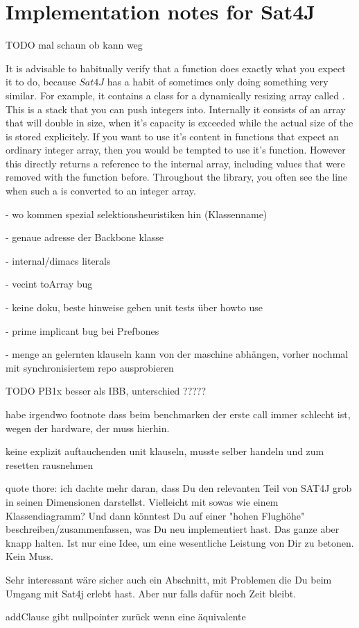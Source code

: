 \section{Implementation notes for Sat4J}




TODO mal schaun ob kann weg


It is advisable to habitually verify that a function does exactly what you expect it to do, because $Sat4J$ has a habit of sometimes only doing something very similar. For example, it contains a class for a dynamically resizing array called . This is a stack that you can push integers into. Internally it consists of an array that will double in size, when it's capacity is exceeded while the actual size of the  is stored explicitely. If you want to use it's content in functions that expect an ordinary integer array, then you would be tempted to use it's  function. However this directly returns a reference to the internal array, including values that were removed with the  function before. Throughout the library, you often see the line  when such a  is converted to an integer array. 

- wo kommen spezial selektionsheuristiken hin (Klassenname)

- genaue adresse der Backbone klasse

- internal/dimacs literals

- vecint toArray bug

- keine doku, beste hinweise geben unit tests über howto use

- prime implicant bug bei Prefbones

- menge an gelernten klauseln kann von der maschine abhängen, vorher nochmal mit synchronisiertem repo ausprobieren

TODO PB1x besser als IBB, unterschied ?????

habe irgendwo footnote dass beim benchmarken der erste call immer schlecht ist, wegen der hardware, der muss hierhin.

keine explizit auftauchenden unit klauseln, musste selber handeln und zum resetten rausnehmen

quote thore: ich dachte mehr daran, dass Du den relevanten Teil von SAT4J grob in seinen Dimensionen darstellst. Vielleicht mit sowas wie einem Klassendiagramm? Und dann könntest Du auf einer "hohen Flughöhe" beschreiben/zusammenfassen, was Du neu implementiert hast. Das ganze aber knapp halten. Ist nur eine Idee, um eine wesentliche Leistung von Dir zu betonen. Kein Muss.

Sehr interessant wäre sicher auch ein Abschnitt, mit Problemen die Du beim Umgang mit Sat4j erlebt hast. Aber nur falls dafür noch Zeit bleibt. 


addClause gibt nullpointer zurück wenn eine äquivalente 